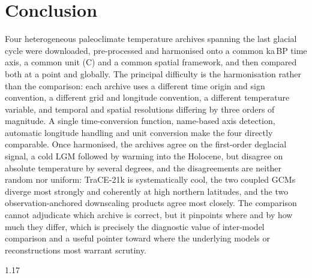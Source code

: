 \documentclass{isprs} %
\newcommand{\degC}{\textdegree C}
\newcommand{\kaBP}{ka\,BP}
\begin{document}
\section{Conclusion}
Four heterogeneous paleoclimate temperature archives spanning the last glacial cycle were downloaded, pre-processed and harmonised onto a common \kaBP{} time axis, a common unit (\degC) and a common spatial framework, and then compared both at a point and globally. The principal difficulty is the harmonisation rather than the comparison: each archive uses a different time origin and sign convention, a different grid and longitude convention, a different temperature variable, and temporal and spatial resolutions differing by three orders of magnitude. A single time-conversion function, name-based axis detection, automatic longitude handling and unit conversion make the four directly comparable. Once harmonised, the archives agree on the first-order deglacial signal, a cold LGM followed by warming into the Holocene, but disagree on absolute temperature by several degrees, and the disagreements are neither random nor uniform: TraCE-21k is systematically cool, the two coupled GCMs diverge most strongly and coherently at high northern latitudes, and the two observation-anchored downscaling products agree most closely. The comparison cannot adjudicate which archive is correct, but it pinpoints where and by how much they differ, which is precisely the diagnostic value of inter-model comparison and a useful pointer toward where the underlying models or reconstructions most warrant scrutiny.

{
	\begin{spacing}{1.17}
		\normalsize
	\end{spacing}
}
\end{document}
